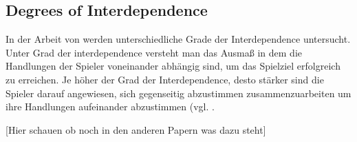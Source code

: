 
\subsection{Degrees of Interdependence}
In der Arbeit von \cite[S. 7]{harris_asymmetry_2019} werden unterschiedliche Grade der Interdependence untersucht. Unter Grad der interdependence versteht man das Ausmaß in dem die Handlungen der Spieler voneinander abhängig sind, um das Spielziel erfolgreich zu erreichen. Je höher der Grad der Interdependence, desto stärker sind die Spieler darauf angewiesen, sich gegenseitig abzustimmen zusammenzuarbeiten um ihre Handlungen aufeinander abzustimmen (vgl. \cite[S. 7]{harris_asymmetry_2019}.

[Hier schauen ob noch in den anderen Papern was dazu steht]



